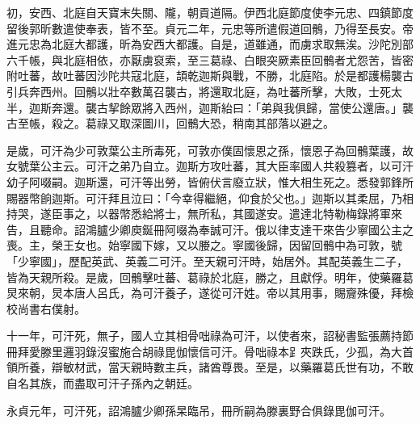 \begin{pinyinscope}
 初，安西、北庭自天寶末失關、隴，朝貢道隔。伊西北庭節度使李元忠、四鎮節度留後郭昕數遣使奉表，皆不至。貞元二年，元忠等所遣假道回鶻，乃得至長安。帝進元忠為北庭大都護，昕為安西大都護。自是，道雖通，而虜求取無涘。沙陀別部六千帳，與北庭相依，亦厭虜裒索，至三葛祿、白眼突厥素臣回鶻者尤怨苦，皆密附吐蕃，故吐蕃因沙陀共寇北庭，頡乾迦斯與戰，不勝，北庭陷。於是都護楊襲古引兵奔西州。回鶻以壯卒數萬召襲古，將還取北庭，為吐蕃所擊，大敗，士死太半，迦斯奔還。襲古挈餘眾將入西州，迦斯紿曰：「弟與我俱歸，當使公還唐。」襲古至帳，殺之。葛祿又取深圖川，回鶻大恐，稍南其部落以避之。



 是歲，可汗為少可敦葉公主所毒死，可敦亦僕固懷恩之孫，懷恩子為回鶻葉護，故女號葉公主云。可汗之弟乃自立。迦斯方攻吐蕃，其大臣率國人共殺篡者，以可汗幼子阿啜嗣。迦斯還，可汗等出勞，皆俯伏言廢立狀，惟大相生死之。悉發郭鋒所賜器幣餉迦斯。可汗拜且泣曰：「今幸得繼絕，仰食於父也。」迦斯以其柔屈，乃相持哭，遂臣事之，以器幣悉給將士，無所私，其國遂安。遣達北特勒梅錄將軍來告，且聽命。詔鴻臚少卿庾鋋冊阿啜為奉誠可汗。俄以律支達干來告少寧國公主之喪。主，榮王女也。始寧國下嫁，又以媵之。寧國後歸，因留回鶻中為可敦，號「少寧國」，歷配英武、英義二可汗。至天親可汗時，始居外。其配英義生二子，皆為天親所殺。是歲，回鶻擊吐蕃、葛祿於北庭，勝之，且獻俘。明年，使藥羅葛炅來朝，炅本唐人呂氏，為可汗養子，遂從可汗姓。帝以其用事，賜齎殊優，拜檢校尚書右僕射。



 十一年，可汗死，無子，國人立其相骨咄祿為可汗，以使者來，詔秘書監張薦持節冊拜愛滕里邏羽錄沒蜜施合胡祿毘伽懷信可汗。骨咄祿本𧾷夾跌氏，少孤，為大首領所養，辯敏材武，當天親時數主兵，諸酋尊畏。至是，以藥羅葛氏世有功，不敢自名其族，而盡取可汗子孫內之朝廷。



 永貞元年，可汗死，詔鴻臚少卿孫杲臨吊，冊所嗣為滕裏野合俱錄毘伽可汗。




\end{pinyinscope}
